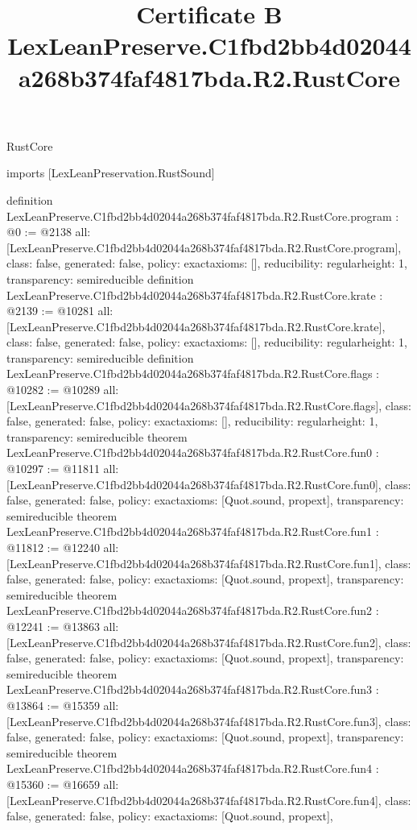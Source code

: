 \begin{lexlean}{RustCore}
\title{Certificate B LexLeanPreserve.C1fbd2bb4d02044a268b374faf4817bda.R2.RustCore}
\begin{coremodule}
imports [LexLeanPreservation.RustSound]

definition LexLeanPreserve.C1fbd2bb4d02044a268b374faf4817bda.R2.RustCore.program : @0 := @2138 {
  all: [LexLeanPreserve.C1fbd2bb4d02044a268b374faf4817bda.R2.RustCore.program],
  class: false,
  generated: false,
  policy: exact{axioms: []},
  reducibility: regular{height: 1},
  transparency: semireducible
}
definition LexLeanPreserve.C1fbd2bb4d02044a268b374faf4817bda.R2.RustCore.krate : @2139 := @10281 {
  all: [LexLeanPreserve.C1fbd2bb4d02044a268b374faf4817bda.R2.RustCore.krate],
  class: false,
  generated: false,
  policy: exact{axioms: []},
  reducibility: regular{height: 1},
  transparency: semireducible
}
definition LexLeanPreserve.C1fbd2bb4d02044a268b374faf4817bda.R2.RustCore.flags : @10282 := @10289 {
  all: [LexLeanPreserve.C1fbd2bb4d02044a268b374faf4817bda.R2.RustCore.flags],
  class: false,
  generated: false,
  policy: exact{axioms: []},
  reducibility: regular{height: 1},
  transparency: semireducible
}
theorem LexLeanPreserve.C1fbd2bb4d02044a268b374faf4817bda.R2.RustCore.fun0 : @10297 := @11811 {
  all: [LexLeanPreserve.C1fbd2bb4d02044a268b374faf4817bda.R2.RustCore.fun0],
  class: false,
  generated: false,
  policy: exact{axioms: [Quot.sound, propext]},
  transparency: semireducible
}
theorem LexLeanPreserve.C1fbd2bb4d02044a268b374faf4817bda.R2.RustCore.fun1 : @11812 := @12240 {
  all: [LexLeanPreserve.C1fbd2bb4d02044a268b374faf4817bda.R2.RustCore.fun1],
  class: false,
  generated: false,
  policy: exact{axioms: [Quot.sound, propext]},
  transparency: semireducible
}
theorem LexLeanPreserve.C1fbd2bb4d02044a268b374faf4817bda.R2.RustCore.fun2 : @12241 := @13863 {
  all: [LexLeanPreserve.C1fbd2bb4d02044a268b374faf4817bda.R2.RustCore.fun2],
  class: false,
  generated: false,
  policy: exact{axioms: [Quot.sound, propext]},
  transparency: semireducible
}
theorem LexLeanPreserve.C1fbd2bb4d02044a268b374faf4817bda.R2.RustCore.fun3 : @13864 := @15359 {
  all: [LexLeanPreserve.C1fbd2bb4d02044a268b374faf4817bda.R2.RustCore.fun3],
  class: false,
  generated: false,
  policy: exact{axioms: [Quot.sound, propext]},
  transparency: semireducible
}
theorem LexLeanPreserve.C1fbd2bb4d02044a268b374faf4817bda.R2.RustCore.fun4 : @15360 := @16659 {
  all: [LexLeanPreserve.C1fbd2bb4d02044a268b374faf4817bda.R2.RustCore.fun4],
  class: false,
  generated: false,
  policy: exact{axioms: [Quot.sound, propext]},
}
\end{coremodule}
\end{lexlean}
